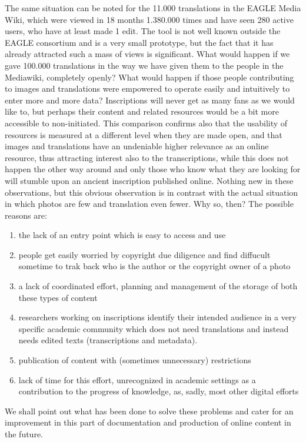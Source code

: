 \documentclass[amsthm,ebook]{saparticle}
\begin{document}
The same situation can be noted for the 11.000 translations in the EAGLE Media Wiki, which were viewed in 18 months 1.380.000 times and have seen 280 active users, who have at least made 1 edit. The tool is not well known outside the EAGLE consortium and is a very small prototype, but the fact that it has already attracted such a mass of views is significant. What would happen if we gave 100.000 translations in the way we have given them to the people in the Mediawiki, completely openly? What would happen if those people contributing to images and translations were empowered to operate easily and intuitively to enter more and more data? Inscriptions will never get as many fans as we would like to, but perhaps their content and related resources would be a bit more accessible to non-initiated. 
This comparison confirms also that the usability of resources is measured at a different level when they are made open, and that images and translations have an undeniable higher relevance as an online resource, thus attracting interest also to the transcriptions, while this does not happen the other way around and only those who know what they are looking for will stumble upon an ancient inscription published online. Nothing new in these observations, but this obvious observation is in contrast with the actual situation in which photos are few and translation even fewer. Why so, then? The possible reasons are:
\begin{enumerate}
\item the lack of an entry point which is easy to access and use
\item people get easily worried by copyright due diligence and find diffucult sometime to trak back who is the author or the copyright owner of a photo
\item a lack of coordinated effort, planning and management of the storage of both these types of content
\item researchers working on inscriptions identify their intended audience in a very specific academic community which does not need translations and instead needs edited texts (transcriptions and metadata). 
\item publication of content with (sometimes unnecessary) restrictions
\item lack of time for this effort, unrecognized in academic settings as a contribution to the progress of knowledge, as, sadly, most other digital efforts
\end{enumerate}

We shall point out what has been done to solve these problems and cater for an improvement in this part of documentation and production of online content in the future.
\end{document}
